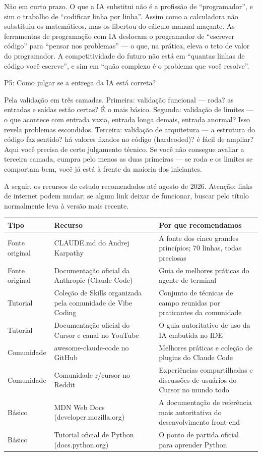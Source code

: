 Não em curto prazo. O que a IA substitui não é a profissão de “programador”, e sim o trabalho de “codificar linha por linha”. Assim como a calculadora não substituiu os matemáticos, mas os libertou do cálculo manual maçante. As ferramentas de programação com IA deslocam o programador de “escrever código” para “pensar nos problemas” — o que, na prática, eleva o teto de valor do programador. A competitividade do futuro não está em “quantas linhas de código você escreve”, e sim em “quão complexo é o problema que você resolve”.

P5: Como julgar se a entrega da IA está correta?

Pela validação em três camadas. Primeira: validação funcional — roda? as entradas e saídas estão certas? É o mais básico. Segunda: validação de limites — o que acontece com entrada vazia, entrada longa demais, entrada anormal? Isso revela problemas escondidos. Terceira: validação de arquitetura — a estrutura do código faz sentido? há valores fixados no código (hardcoded)? é fácil de ampliar? Aqui você precisa de certo julgamento técnico. Se você não consegue avaliar a terceira camada, cumpra pelo menos as duas primeiras — se roda e os limites se comportam bem, você já está à frente da maioria dos iniciantes.


A seguir, os recursos de estudo recomendados até agosto de 2026. Atenção: links de internet podem mudar; se algum link deixar de funcionar, buscar pelo título normalmente leva à versão mais recente.

\begin{center}
\begin{tabularx}{\linewidth}{|X|X|X|}
\hline
\textbf{Tipo} & \textbf{Recurso} & \textbf{Por que recomendamos} \tabularnewline
\hline
Fonte original & CLAUDE.md do Andrej Karpathy & A fonte dos cinco grandes princípios; 70 linhas, todas preciosas \tabularnewline
Fonte original & Documentação oficial da Anthropic (Claude Code) & Guia de melhores práticas do agente de terminal \tabularnewline
Tutorial & Coleção de Skills organizada pela comunidade de Vibe Coding & Conjunto de técnicas de campo reunidas por praticantes da comunidade \tabularnewline
Tutorial & Documentação oficial do Cursor e canal no YouTube & O guia autoritativo de uso da IA embutida no IDE \tabularnewline
Comunidade & awesome-claude-code no GitHub & Melhores práticas e coleção de plugins do Claude Code \tabularnewline
Comunidade & Comunidade r/cursor no Reddit & Experiências compartilhadas e discussões de usuários do Cursor no mundo todo \tabularnewline
Básico & MDN Web Docs (developer.mozilla.org) & A documentação de referência mais autoritativa do desenvolvimento front-end \tabularnewline
Básico & Tutorial oficial de Python (docs.python.org) & O ponto de partida oficial para aprender Python \tabularnewline
\hline
\end{tabularx}
\end{center}

